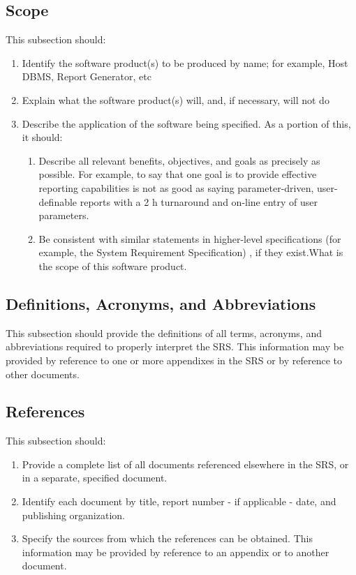 \documentclass[titlepage]{article}
\begin{document}
\subsection{Scope}
This subsection should:
\begin{enumerate}
  \item Identify the software product(s) to be produced by name; for example, Host DBMS, Report Generator, etc
  \item Explain what the software product(s) will, and, if necessary, will not do
  \item Describe the application of the software being specified. As a portion of this, it should:
  \begin{enumerate}
  	\item Describe all relevant benefits, objectives, and goals as precisely as possible. For example, to say that one goal is to provide effective reporting capabilities is not as good as saying parameter-driven, user-definable reports with a 2 h turnaround and on-line entry of user parameters.
  	\item Be consistent with similar statements in higher-level specifications (for example, the System Requirement Specification) , if they exist.What is the scope of this software product.
  \end{enumerate}
\end{enumerate}


\subsection{Definitions, Acronyms, and Abbreviations}
This subsection should provide the definitions of all terms, acronyms, and abbreviations required to properly interpret the SRS. This information may be provided by reference to one or more appendixes in the SRS or by reference to other documents.

\subsection{References}
This subsection should:
\begin{enumerate}
	\item Provide a complete list of all documents referenced elsewhere in the SRS, or in a separate, specified document.
	\item Identify each document by title, report number - if applicable - date, and publishing organization.
	\item Specify the sources from which the references can be obtained. 
This information may be provided by reference to an appendix or to another document.
\end{enumerate}
\end{document}
